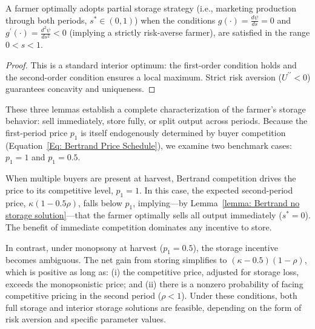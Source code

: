 \begin{lemma}
    A farmer optimally adopts partial storage strategy (i.e., marketing production through both periods, $s^*\in (0,1)$) when the conditions $g(\cdot)  =  \frac{d \psi}{d s} = 0$ and $g^\prime(\cdot) = \frac{d^2 \psi}{d s^2} < 0 $ (implying a strictly risk-averse farmer), are satisfied in the range $0<s<1$.
    \label{lemma: Bertrand Interior solution}
\end{lemma}
\begin{proof}
    This is a standard interior optimum: the first-order condition holds and the second-order condition ensures a local maximum. Strict risk aversion ($U^{\prime\prime} < 0$) guarantees concavity and uniqueness.
\end{proof}

These three lemmas establish a complete characterization of the farmer’s storage behavior: sell immediately, store fully, or split output across periods. Because the first-period price $p_1$ is itself endogenously determined by buyer competition (Equation~\ref{Eq: Bertrand Price Schedule}), we examine two benchmark cases: $p_1 = 1$ and $p_1 = 0.5$.

When multiple buyers are present at harvest, Bertrand competition drives the price to its competitive level, $p_1 = 1$. In this case, the expected second-period price, $\kappa(1 - 0.5\rho)$, falls below $p_1$, implying—by Lemma~\ref{lemma: Bertrand no storage solution}—that the farmer optimally sells all output immediately ($s^* = 0$). The benefit of immediate competition dominates any incentive to store.

In contrast, under monopsony at harvest ($p_1 = 0.5$), the storage incentive becomes ambiguous. The net gain from storing simplifies to $(\kappa -0.5)(1 - \rho)$, which is positive as long as: (i) the competitive price, adjusted for storage loss, exceeds the monopsonistic price; and (ii) there is a nonzero probability of facing competitive pricing in the second period ($\rho < 1$). Under these conditions, both full storage and interior storage solutions are feasible, depending on the form of risk aversion and specific parameter values.

